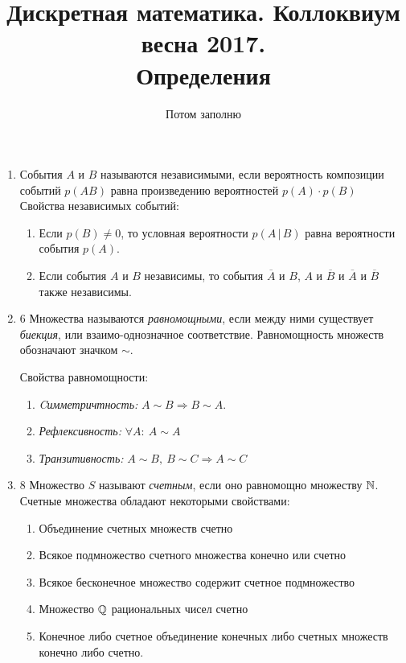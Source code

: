 \documentclass[a4paper,12pt]{article}
\begin{document}
	\title{Дискретная математика. Коллоквиум весна 2017.\\ Определения}
	\author{Потом заполню}
	\maketitle
	
	\begin{enumerate}
        \item
        События $A$ и $B$ называются независимыми, если вероятность композиции событий $p(AB)$ равна произведению вероятностей $p(A)\cdot p(B)$
        \medskip\\
        Свойства независимых событий: \begin{enumerate}
            \item Если $p(B)\ne0$, то условная вероятности $p(A\,|\,B)$ равна вероятности события $p(A)$.
            \item Если события $A$ и $B$ независимы, то события $\overline{A}$ и $B$, $A$ и $\overline{B}$ и $\overline{A}$ и $\overline{B}$ также независимы.
        \end{enumerate}
		\item 6
		Множества называются \textit{равномощными}, если между ними существует \textit{биекция}, или взаимо-однозначное соответствие. Равномощность множеств обозначают значком $\sim$.
		
		Свойства равномощности:
		\begin{enumerate}
			\item \textit{Cимметричтность:} $A \sim B \Rightarrow B \sim A$.
			\item \textit{Рефлексивность:} $\forall A: \ A \sim A$
			\item \textit{Транзитивность:} $A \sim B, \ B \sim C  \Rightarrow A \sim C$
		\end{enumerate}
	
		\item 8
		Множество $S$ называют \textit{счетным}, если оно равномощно множеству $\mathbb{N}$.	Счетные множества обладают некоторыми свойствами:
		\begin{enumerate}
			\item Объединение счетных множеств счетно
			\item Всякое подмножество счетного множества конечно или счетно
			\item Всякое бесконечное множество содержит счетное подмножество
			\item Множество $\mathbb{Q}$ рациональных чисел счетно
			\item 
			Конечное либо счетное объединение конечных либо счетных множеств конечно либо счетно.
			

\end{enumerate}
\end{enumerate}
\end{document}
